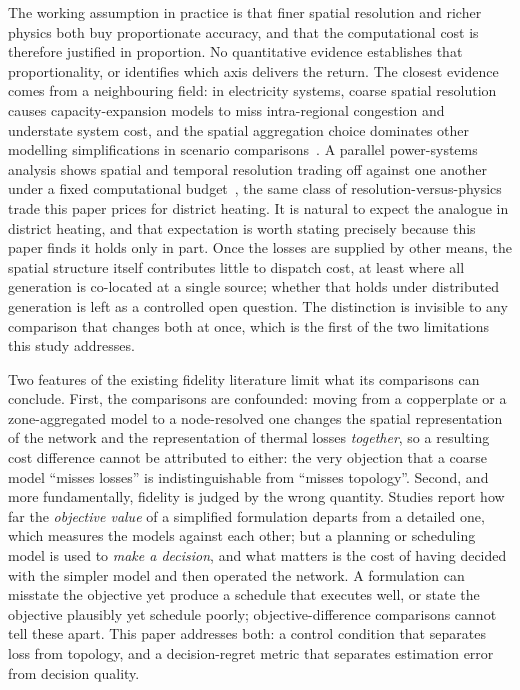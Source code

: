 \documentclass[a4paper,fleqn]{cas-sc}
\providecommand{\citep}[1]{\cite{#1}}
\begin{document}
The working assumption in practice is that finer spatial resolution and richer physics
both buy proportionate accuracy, and that the computational cost is therefore justified in
proportion. No quantitative evidence establishes that proportionality, or identifies which
axis delivers the return. The closest evidence comes from a neighbouring field: in
electricity systems, coarse spatial resolution causes capacity-expansion models to miss
intra-regional congestion and understate system cost, and the spatial aggregation choice
dominates other modelling simplifications in scenario
comparisons~\cite{Frysztacki2021}. A parallel power-systems analysis shows spatial and
temporal resolution trading off against one another under a fixed computational
budget~\citep{FrewJacobson2016}, the same class of resolution-versus-physics trade this
paper prices for district heating. It is natural to expect the analogue in district
heating, and that expectation is worth stating precisely because this paper finds it
holds only in part. Once the losses are supplied by other means, the spatial structure itself
contributes little to dispatch cost, at least where all generation is co-located at a
single source; whether that holds under distributed generation is left as a
controlled open question. The distinction is
invisible to any comparison that changes both at once, which is the first of the two
limitations this study addresses.

Two features of the existing fidelity literature limit what its comparisons can
conclude. First, the comparisons are confounded: moving from a copperplate or a
zone-aggregated model to a node-resolved one changes the spatial representation of the
network and the representation of thermal losses \emph{together}, so a resulting cost
difference cannot be attributed to either: the very objection that a coarse model
``misses losses'' is indistinguishable from ``misses topology''. Second, and more
fundamentally, fidelity is judged by the wrong quantity. Studies report how far the
\emph{objective value} of a simplified formulation departs from a detailed one, which
measures the models against each other; but a planning or scheduling model is used to
\emph{make a decision}, and what matters is the cost of having decided with the simpler
model and then operated the network. A formulation can misstate the objective yet
produce a schedule that executes well, or state the objective plausibly yet schedule
poorly; objective-difference comparisons cannot tell these apart. This paper addresses
both: a control condition that separates loss from topology, and a decision-regret
metric that separates estimation error from decision quality.
\end{document}
